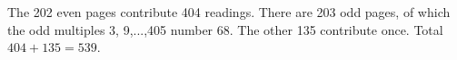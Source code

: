 The 202 even pages contribute 404 readings. There are 203 odd pages, of which the odd multiples 3, 9,...,405 number 68. The other 135 contribute once. Total $404+135=\boxed{539}$.
